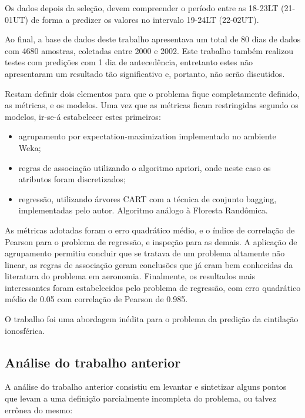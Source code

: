 Os dados depois da seleção, devem compreender o período  entre as 18-23LT (21-01UT) de forma a predizer os valores no intervalo 19-24LT (22-02UT).

Ao final, a base de dados deste trabalho apresentava um total de 80 dias de dados com 4680 amostras, coletadas entre 2000 e 2002. Este trabalho também realizou testes com predições com 1 dia de antecedência, entretanto estes não apresentaram um resultado tão significativo e, portanto, não serão discutidos.

Restam definir dois elementos para que o problema fique completamente definido, as métricas, e os modelos. Uma vez que as métricas ficam restringidas segundo os modelos, ir-se-á estabelecer estes primeiros:

\begin{itemize}
\item agrupamento por expectation-maximization implementado no ambiente Weka;
\item regras de associação utilizando o algoritmo apriori, onde neste caso os atributos foram discretizados;
\item regressão, utilizando árvores CART com a técnica de conjunto bagging, implementadas pelo autor. Algoritmo análogo à Floresta Randômica.
\end{itemize}

As métricas adotadas foram o erro quadrático médio, e o índice de correlação de Pearson para o problema de regressão, e inspeção para as demais. A aplicação de agrupamento permitiu concluir que se tratava de um problema altamente não linear, as regras de associação geram conclusões que já eram bem conhecidas da literatura do problema em aeronomia. Finalmente, os resultados mais interessantes foram estabelecidos pelo problema de regressão, com erro quadrático médio de 0.05 com correlação de Pearson de 0.985.

O trabalho foi uma abordagem inédita para o problema da predição da cintilação ionosférica.

\subsection{Análise do trabalho anterior}

A análise do trabalho anterior \cite{REZENDE:2009} consistiu em levantar e sintetizar alguns pontos que levam a uma definição parcialmente incompleta do problema, ou talvez errônea do mesmo:


